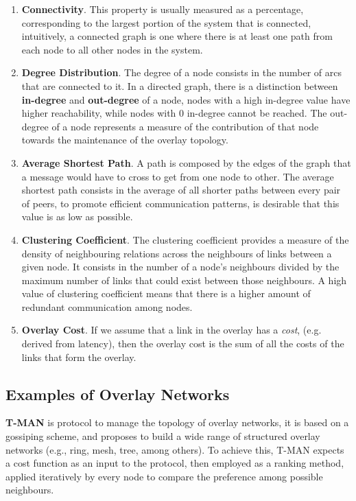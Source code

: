 \begin{enumerate}
    
    \item \textbf{Connectivity}. This property is usually measured as a percentage, corresponding to the largest portion of the system that is connected, intuitively, a connected graph is one where there is at least one path from each node to all other nodes in the system.
    
    \item \textbf{Degree Distribution}. The degree of a node consists in the number of arcs that are connected to it. In a directed graph, there is a distinction between \textbf{in-degree} and \textbf{out-degree} of a node, nodes with a high in-degree value have higher reachability, while nodes with 0 in-degree cannot be reached. The out-degree of a node represents a measure of the contribution of that node towards the maintenance of the overlay topology.
    
    \item \textbf{Average Shortest Path}. A path is composed by the edges of the graph that a message would have to cross to get from one node to other. The average shortest path consists in the average of all shorter paths between every pair of peers, to promote efficient communication patterns, is desirable that this value is as low as possible.
    
    \item \textbf{Clustering Coefficient}. The clustering coefficient provides a measure of the density of neighbouring relations across the neighbours of links between a given node. It consists in the number of a node's neighbours divided by the maximum number of links that could exist between those neighbours. A high value of clustering coefficient means that there is a higher amount of redundant communication among nodes.
    
    \item \textbf{Overlay Cost}. If we assume that a link in the overlay has a \textit{cost}, (e.g. derived from latency), then the overlay cost is the sum of all the costs of the links that form the overlay. 
    
\end{enumerate}

\subsection{Examples of Overlay Networks}

\textbf{T-MAN} \cite{jelasity2005t} is protocol to manage the topology of overlay networks, it is based on a gossiping scheme, and proposes to build a wide range of structured overlay networks (e.g., ring, mesh, tree, among others). To achieve this, T-MAN expects a cost function as an input to the protocol, then employed as a ranking method, applied iteratively by every node to compare the preference among possible neighbours. 

